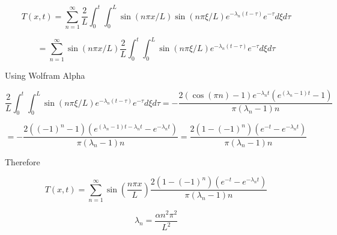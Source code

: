 \documentclass[11pt]{article}
\begin{document}
\begin{equation}
	T(x,t)
	=
	\sum_{n=1}^{\infty}
	\frac{2}{L}
	\int_0^t \int_0^L
	\sin(n\pi x/L)
	\sin(n\pi \xi/L)
	e^{-\lambda_n (t-\tau)}
	e^{-\tau}
	d\xi d\tau
\end{equation}

\begin{equation}
	=
	\sum_{n=1}^{\infty}
	\sin(n\pi x/L)
	\frac{2}{L}
	\int_0^t \int_0^L
	\sin(n\pi \xi/L)
	e^{-\lambda_n (t-\tau)}
	e^{-\tau}
	d\xi d\tau
\end{equation}

Using Wolfram Alpha

\begin{equation}
	\frac{2}{L}
	\int_0^t \int_0^L
	\sin(n\pi \xi/L)
	e^{-\lambda_n (t-\tau)}
	e^{-\tau}
	d\xi d\tau
	=
	- \frac{2 (\cos(\pi n) - 1) e^{-\lambda_n t} (e^{(\lambda_n-1)t}-1)}{\pi (\lambda_n-1)n}
\end{equation}

\begin{equation}
	=
	- \frac{2 ((-1)^n - 1) (e^{(\lambda_n-1)t-\lambda_n t}-e^{-\lambda_n t})}{\pi (\lambda_n-1)n}
	=
	\frac{2 (1 - (-1)^n) (e^{-t}-e^{-\lambda_n t})}{\pi (\lambda_n-1)n}
\end{equation}

Therefore

\begin{equation}
	\boxed{
	T(x,t)
	=
	\sum_{n=1}^{\infty}
	\sin \left( \frac{n\pi x}{L} \right)
	\frac{2 (1 - (-1)^n) (e^{-t}-e^{-\lambda_n t})}{\pi (\lambda_n-1)n}
	}
\end{equation}


\begin{equation}
	\boxed{
	\lambda_n = \frac{\alpha n^2\pi^2}{L^2}
	}
\end{equation}
\end{document}
